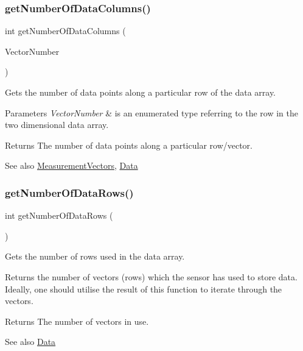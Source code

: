 \subsubsection{\texorpdfstring{getNumberOfDataColumns()}{getNumberOfDataColumns()}}
{\footnotesize\ttfamily int get\+Number\+Of\+Data\+Columns (\begin{DoxyParamCaption}\item[{const \mbox{\hyperlink{_s_p_i___instruction_set_8h_a9d8048399836e11887f85cc8dc3d75d5}{Measurement\+Vectors}}}]{Vector\+Number }\end{DoxyParamCaption})}



Gets the number of data points along a particular row of the data array. 


\begin{DoxyParams}{Parameters}
{\em Vector\+Number} & is an enumerated type referring to the row in the two dimensional data array. \\
\hline
\end{DoxyParams}
\begin{DoxyReturn}{Returns}
The number of data points along a particular row/vector. 
\end{DoxyReturn}
\begin{DoxySeeAlso}{See also}
\mbox{\hyperlink{_s_p_i___instruction_set_8h_a9d8048399836e11887f85cc8dc3d75d5}{Measurement\+Vectors}}, \mbox{\hyperlink{struct_data}{Data}} 
\end{DoxySeeAlso}
\mbox{\label{class_data_source_a52269fa43b741f1ab431aac56d3aedb5}} 
\subsubsection{\texorpdfstring{getNumberOfDataRows()}{getNumberOfDataRows()}}
{\footnotesize\ttfamily int get\+Number\+Of\+Data\+Rows (\begin{DoxyParamCaption}\item[{void}]{ }\end{DoxyParamCaption})}



Gets the number of rows used in the data array. 

Returns the number of \textquotesingle{}vectors\textquotesingle{} (rows) which the sensor has used to store data. Ideally, one should utilise the result of this function to iterate through the vectors. \begin{DoxyReturn}{Returns}
The number of vectors in use. 
\end{DoxyReturn}
\begin{DoxySeeAlso}{See also}
\mbox{\hyperlink{struct_data}{Data}} 
\end{DoxySeeAlso}
\mbox{\label{class_data_source_acdeb2ae03f2c70d19565381d111a1a4d}} 
